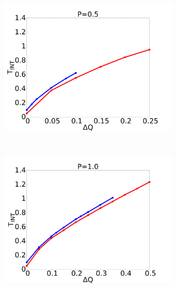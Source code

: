 \documentclass{beamer}
\begin{document}
\begin{frame}
\begin{figure}[h]
\begin{center}
\begin{subfigure}[t]{0.3\textwidth}
            \includegraphics[scale=0.09]{../images/p05_int.pdf}
        \end{subfigure} 
        \
        \begin{subfigure}[t]{0.3\textwidth}
            \includegraphics[scale=0.09]{../images/p1_int.pdf}
        \end{subfigure} 
        \\
        \begin{subfigure}[t]{0.3\textwidth}

\end{subfigure}
\end{center}
\end{figure}
\end{frame}
\end{document}
